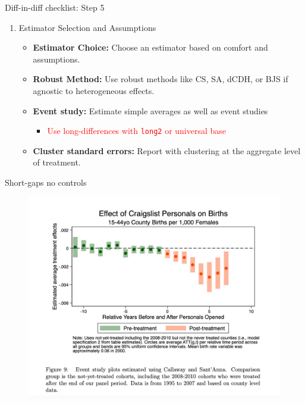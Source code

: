 \documentclass{beamer}
\begin{document}
\begin{frame}{Diff-in-diff checklist: Step 5}
\begin{enumerate}
\item[5. ]Estimator Selection and Assumptions
    \begin{itemize}
        \item \textbf{Estimator Choice:} Choose an estimator based on comfort and assumptions.
        \item \textbf{Robust Method:} Use robust methods like CS, SA, dCDH, or BJS if agnostic to heterogeneous effects.
        \item \textbf{Event study:} Estimate simple averages as well as event studies 
        		\begin{itemize}
		\item \textcolor{red}{Use long-differences with \texttt{long2} or universal base}
		\end{itemize}
        \item \textbf{Cluster standard errors:} Report with clustering at the aggregate level of treatment.
    \end{itemize}
\end{enumerate}
\end{frame}



\begin{frame}{Short-gaps no controls}

\begin{figure}[ht]
    \centering
    \includegraphics[width=\linewidth, height=0.8\textheight, keepaspectratio]{./lecture_includes/es_births_shortgapNC}
\end{figure}

\end{frame}
\end{document}
